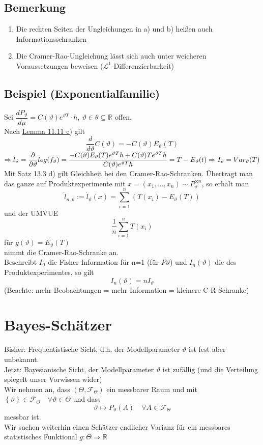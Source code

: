 \documentclass[german,10pt,oneside, fleqn, a4paper]{article}
\newcommand {\R}	{\mathbb{R}}
\newcommand{\Ra}	{\Rightarrow}
\newcommand{\sm}[2][\infty]{\sum\limits_{#2}^{#1}}
\newcommand{\brac}[1]{\left\lbrace #1\right\rbrace}
\newcommand{\mc}[1]{\mathcal{#1}}
\newcommand{\lp}[1]{\mc{L}^{#1}}
\newcommand{\1}[1]{1_{#1}}
\newcommand{\2}[1]{\1{\brac{#1}}}
\newcommand{\f}{\mc{F}}
\newcommand{\sumi}{\sm[n]{i=1}}
\newcommand{\qf}{\quad\forall}
\newcommand{\stuff}{{\otimes n}}
\begin{document}
\subsection{Bemerkung}
\label{13.4}
\begin{enumerate}[label=(\roman*)]
\item Die rechten Seiten der Ungleichungen in a) und b) heißen auch\\ Informationsschranken
\item Die Cramer-Rao-Ungleichung lässt sich auch unter weicheren Voraussetzungen beweisen (\grqq$\lp{1}$-Differenzierbarkeit\grqq)
\end{enumerate}

\subsection{Beispiel (Exponentialfamilie)}
\label{13.5}
Sei $\dfrac{dP_\vartheta}{d\mu}=C(\vartheta)e^{\vartheta T}\cdot h,\ \vartheta\in\theta\subseteq\R$ offen.\\
Nach \hyperref[11.11]{Lemma 11.11 c)} gilt\[
\dfrac{d}{d\vartheta}C(\vartheta)=-C(\vartheta)E_\vartheta(T)\]
$\Ra \dot l_\vartheta=\dfrac{\partial}{\partial\vartheta}log(f_\vartheta)=\dfrac{-C(\vartheta)E_\vartheta(T)e^{\vartheta T}h+C(\vartheta)Te^{\vartheta T}h}{C(\vartheta)e^{\vartheta T}h}=T-E_\vartheta(t)\\
\Ra I_\vartheta=Var_\vartheta(T)$\\
Mit Satz 13.3 d) gilt Gleichheit bei den Cramer-Rao-Schranken.
Übertragt man das ganze auf Produktexperimente mit $x=(x_1,...,x_n)\sim P_\vartheta^\stuff$, so erhält man \[\dot l_{n,\vartheta}:=\dot l_\vartheta(x)=\sumi(T(x_i)-E_\vartheta(T))\]
und der  UMVUE\[
\dfrac{1}{n}\sumi T(x_i)\]
für $g(\vartheta)=E_\vartheta(T)$\\
nimmt die Cramer-Rao-Schranke an.\\
Beschreibt $I_\vartheta$ die Fisher-Information für n=1 (für $P\vartheta$) und $I_n(\vartheta)$ die des Produktexperimentes, so gilt\[I_n(\vartheta)=nI_\vartheta\]
(Beachte: mehr Beobachtungen = mehr Information = kleinere C-R-Schranke)


\pagebreak
\section{Bayes-Schätzer}
Bisher: Frequentistische Sicht, d.h. der Modellparameter $\vartheta$ ist fest aber unbekannt.\\
Jetzt: Bayesianische Sicht, der Modellparameter $\vartheta$ ist zufällig (und die Verteilung spiegelt unser Vorwissen wider)\\
Wir nehmen an, dass $(\Theta,\f_\Theta)$ ein messbarer Raum und mit $\brac{\vartheta}\in\f_\Theta\qf\vartheta\in\Theta$ und dass \[\vartheta\mapsto P_\vartheta(A)\qf A\in\f_\Theta\]
messbar ist. \\
Wir suchen weiterhin einen Schätzer endlicher Varianz für ein messbares statistisches Funktional $g:\Theta\Ra\R$
\end{document}
